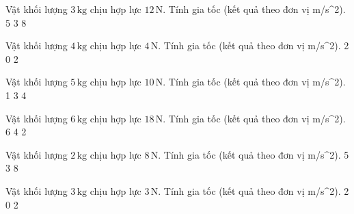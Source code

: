 \begin{ex}
Vật khối lượng $3\,\text{kg}$ chịu hợp lực $12\,\text{N}$. Tính gia tốc (kết quả theo đơn vị m/s^2).
\choice
{}
{5}
{3}
{8}
\end{ex}

\begin{ex}
Vật khối lượng $4\,\text{kg}$ chịu hợp lực $4\,\text{N}$. Tính gia tốc (kết quả theo đơn vị m/s^2).
\choice
{2}
{}
{0}
{2}
\end{ex}

\begin{ex}
Vật khối lượng $5\,\text{kg}$ chịu hợp lực $10\,\text{N}$. Tính gia tốc (kết quả theo đơn vị m/s^2).
\choice
{1}
{3}
{}
{4}
\end{ex}

\begin{ex}
Vật khối lượng $6\,\text{kg}$ chịu hợp lực $18\,\text{N}$. Tính gia tốc (kết quả theo đơn vị m/s^2).
\choice
{6}
{4}
{2}
{}
\end{ex}

\begin{ex}
Vật khối lượng $2\,\text{kg}$ chịu hợp lực $8\,\text{N}$. Tính gia tốc (kết quả theo đơn vị m/s^2).
\choice
{}
{5}
{3}
{8}
\end{ex}

\begin{ex}
Vật khối lượng $3\,\text{kg}$ chịu hợp lực $3\,\text{N}$. Tính gia tốc (kết quả theo đơn vị m/s^2).
\choice
{2}
{}
{0}
{2}
\end{ex}

